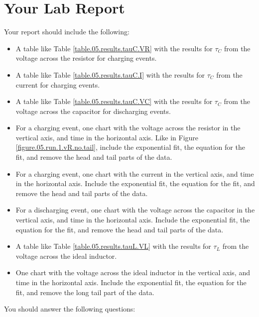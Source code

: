 \section{Your Lab Report}
Your report should include the following:
\begin{itemize}
    \item A table like Table \ref{table.05.results.tauC.VR} with the results for $\tau_{C}$ from the voltage across the resistor for charging events.
    \item A table like Table \ref{table.05.results.tauC.I} with the results for $\tau_{C}$ from the current for charging events.
    \item A table like Table \ref{table.05.results.tauC.VC} with the results for $\tau_{C}$ from the voltage across the capacitor for discharging events.
    \item For a charging event, one chart with the voltage across the resistor in the vertical axis, and time in the horizontal axis. Like in Figure \ref{figure.05.run.1.vR.no.tail}, include the exponential fit, the equation for the fit, and remove the head and tail parts of the data.
    \item For a charging event, one chart with the current in the vertical axis, and time in the horizontal axis. Include the exponential fit, the equation for the fit, and remove the head and tail parts of the data.
    \item For a discharging event, one chart with the voltage across the capacitor in the vertical axis, and time in the horizontal axis. Include the exponential fit, the equation for the fit, and remove the head and tail parts of the data.
    \item A table like Table \ref{table.05.results.tauL.VL} with the results for $\tau_{L}$ from the voltage across the ideal inductor.
    \item One chart with the voltage across the ideal inductor in the vertical axis, and time in the horizontal axis. Include the exponential fit, the equation for the fit, and remove the long tail part of the data.
\end{itemize}
You should answer the following questions:
